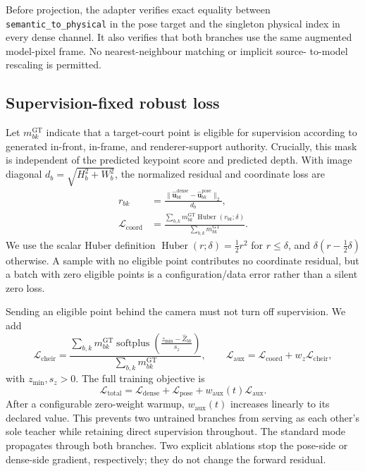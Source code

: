 Before projection, the adapter verifies exact equality between
\texttt{semantic\_to\_physical} in the pose target and the singleton physical
index in every dense channel.  It also verifies that both branches use the same
augmented model-pixel frame.  No nearest-neighbour matching or implicit source-
to-model rescaling is permitted.

\subsection{Supervision-fixed robust loss}

Let \(m^{\mathrm{GT}}_{bk}\) indicate that a target-court point is eligible for
supervision according to generated in-front, in-frame, and renderer-support
authority.  Crucially, this mask is independent of the predicted keypoint score
and predicted depth.  With image diagonal
\(d_b=\sqrt{H_b^2+W_b^2}\), the normalized residual and coordinate loss are
\begin{align}
  r_{bk}
    &=\frac{\|\widehat{\mathbf{u}}^{\mathrm{dense}}_{bk}
              -\widehat{\mathbf{u}}^{\mathrm{pose}}_{bk}\|_2}{d_b}, \\
  \mathcal{L}_{\mathrm{coord}}
    &=\frac{\sum_{b,k}m^{\mathrm{GT}}_{bk}
      \operatorname{Huber}(r_{bk};\delta)}
      {\sum_{b,k}m^{\mathrm{GT}}_{bk}}.
  \label{eq:coordinate_loss}
\end{align}
We use the scalar Huber definition
\(
  \operatorname{Huber}(r;\delta)=\tfrac12r^2
\)
for \(r\leq\delta\), and
\(
  \delta(r-\tfrac12\delta)
\)
otherwise.  A sample with no eligible point contributes no coordinate residual,
but a batch with zero eligible points is a configuration/data error rather than
a silent zero loss.

Sending an eligible point behind the camera must not turn off supervision.  We add
\begin{equation}
  \mathcal{L}_{\mathrm{cheir}}=
  \frac{\sum_{b,k}m^{\mathrm{GT}}_{bk}
    \operatorname{softplus}\!\left(
      \frac{z_{\min}-\widehat Z_{bk}}{s_z}\right)}
       {\sum_{b,k}m^{\mathrm{GT}}_{bk}},
  \qquad
  \mathcal{L}_{\mathrm{aux}}=
     \mathcal{L}_{\mathrm{coord}}+w_z\mathcal{L}_{\mathrm{cheir}},
  \label{eq:cheirality}
\end{equation}
with \(z_{\min},s_z>0\).  The full training objective is
\begin{equation}
  \mathcal{L}_{\mathrm{total}}=
  \mathcal{L}_{\mathrm{dense}}+\mathcal{L}_{\mathrm{pose}}
  +w_{\mathrm{aux}}(t)\mathcal{L}_{\mathrm{aux}}.
  \label{eq:total_loss}
\end{equation}
After a configurable zero-weight warmup, \(w_{\mathrm{aux}}(t)\) increases
linearly to its declared value.  This prevents two untrained branches from
serving as each other's sole teacher while retaining direct supervision
throughout.  The standard mode propagates through both branches.  Two explicit
ablations stop the pose-side or dense-side gradient, respectively; they do not
change the forward residual.

